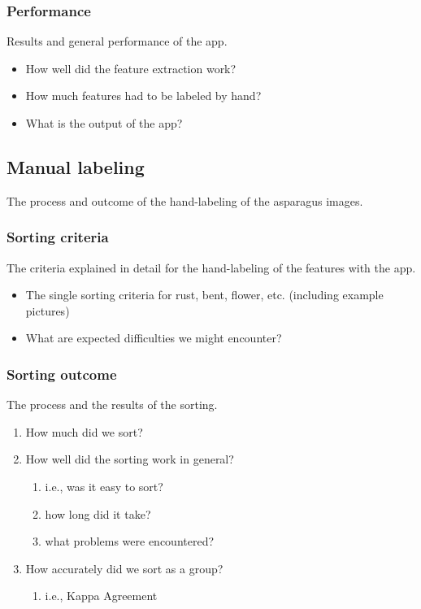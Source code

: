 \subsubsection{Performance}

Results and general performance of the app.

\begin{itemize}
\item How well did the feature extraction work?
\item How much features had to be labeled by hand?
\item What is the output of the app?
\end{itemize}


\subsection{Manual labeling}

The process and outcome of the hand-labeling of the asparagus images.


\subsubsection{Sorting criteria}

The criteria explained in detail for the hand-labeling of the features with the app.

\begin{itemize}
\item The single sorting criteria for rust, bent, flower, etc. (including example pictures)
\item What are expected difficulties we might encounter?
\end{itemize}


\subsubsection{Sorting outcome}

The process and the results of the sorting. 

\begin{enumerate}
\item How much did we sort?
\item How well did the sorting work in general?
\begin{enumerate}
\item i.e., was it easy to sort?
\item how long did it take?
\item what problems were encountered?
\end{enumerate}
\item How accurately did we sort as a group?
\begin{enumerate}
\item i.e., Kappa Agreement
\end{enumerate}
\end{enumerate}



